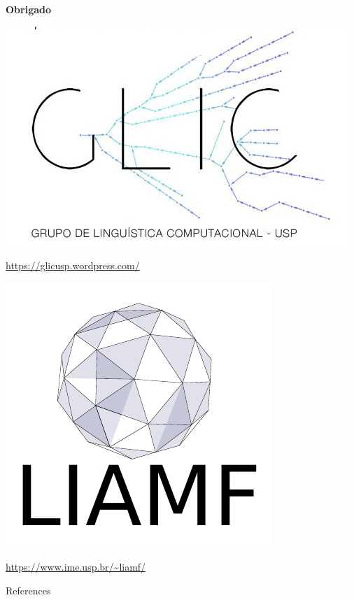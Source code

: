 \documentclass[10pt]{beamer}
\begin{document}
\begin{frame}
\begin{center}
\textbf{\LARGE{Obrigado}}
\end{center}

\vspace{0.3cm}

\begin{center}
\includegraphics[scale=0.2]{images/gliclogo.jpeg}
\end{center}
\url{https://glicusp.wordpress.com/}

\vspace{0.3cm}

\begin{center}
\includegraphics[scale=0.3]{images/logo0.pdf}
\end{center}
\url{https://www.ime.usp.br/~liamf/}

\end{frame}


\begin{frame}[allowframebreaks]{References}

  
  

\end{frame}
\end{document}
